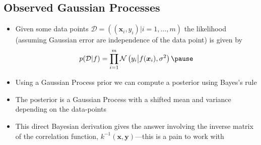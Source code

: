 \Outline %

\begin{slide}
\section[-2]{Observed Gaussian Processes}

\begin{PauseHighLight}
  \begin{itemize}
  \item Given some data points
    $\mathcal{D} = \left( (\bm{x}_i, y_i) \big\vert i=1,\ldots, m
    \right)$ the likelihood (assuming Gaussian error are independence
    of the data point) is given by\vspace*{-0.3cm}
    \begin{align*}
      p(\mathcal{D}| f) = \prod_{i=1}^m
      \mathcal{N}\left(y_i\big\vert f(\bm{x}_i), \sigma^2\right)\pause
    \end{align*}\vspace*{-1.3cm}
  \item Using a Gaussian Process prior we can compute a posterior
    using Bayes's rule\pause
  \item The posterior is a Gaussian Process with a shifted mean and
    variance depending on the data-points\pause
  \item This direct Bayesian derivation gives the answer involving the
    inverse matrix of the correlation function,
    $k^{-1}(\bm{x}, \bm{y})$\pause---this is a pain to work
    with\pauseb
  \end{itemize}
\end{PauseHighLight}

\end{slide}


